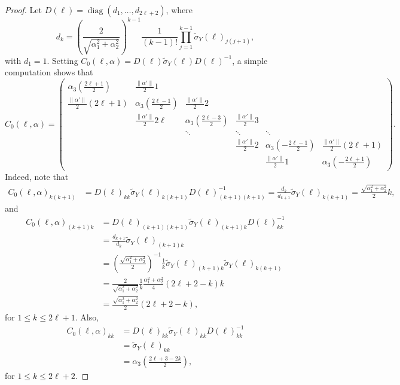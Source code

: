 \documentclass[11pt]{amsart}
\numberwithin{theorem}{section}
\numberwithin{equation}{section}
\theoremstyle{definition}
\numberwithin{example}{section}
\theoremstyle{definition}
\theoremstyle{definition}
\begin{document}
\begin{proof}
Let $D(\ell)= \operatorname{diag}(d_1,\dots,d_{2\ell+2})$, where
\begin{equation*}
    d_k=\left(\frac{2}{\sqrt{\alpha_1^2+\alpha_2^2}}\right)^{k-1}\frac{1}{(k-1)!}\prod_{j=1}^{k-1}\tilde \sigma_{Y}(\ell)_{j(j+1)},
\end{equation*}
with $d_1=1$. Setting $C_0(\ell,\alpha) = D(\ell)\tilde \sigma_{Y}(\ell)D(\ell)^{-1}$, a simple computation shows that 
\begin{equation*}
    C_0(\ell,\alpha)=\begin{pmatrix}
        \alpha_3(\frac{2\ell+1}{2}) & \frac{\|\alpha'\|}{2}1&\\
        \frac{\|\alpha'\|}{2}{(2\ell+1)} &\alpha_3(\frac{2\ell-1}{2})&\frac{\|\alpha'\|}{2}2&\\
        & \frac{\|\alpha'\|}{2}2\ell&\alpha_3(\frac{2\ell-3}{2})&\frac{\|\alpha'\|}{2}3& \\
        &&\ddots&\ddots&\ddots&\\
    &&& \frac{\|\alpha'\|}{2}2&\alpha_3(-\frac{2\ell-1}{2})&\frac{\|\alpha'\|}{2}(2\ell+1)\\
        & &&& \frac{\|\alpha'\|}{2}1&\alpha_3(-\frac{2\ell+1}{2})
    \end{pmatrix}.
\end{equation*}
Indeed, note that 
\begin{align*}
    C_0(\ell,\alpha)_{k(k+1)}&=D(\ell)_{kk}\tilde \sigma_{Y}(\ell)_{k(k+1)}D(\ell)^{-1}_{(k+1)(k+1)}=\frac{d_k}{d_{k+1}}\tilde \sigma_{Y}(\ell)_{k(k+1)}=\frac{\sqrt{\alpha_1^2+\alpha_2^2}}{2}k,
\end{align*}
 and
\begin{align*}
    C_0(\ell,\alpha)_{(k+1)k}&=D(\ell)_{(k+1)(k+1)}\tilde \sigma_{Y}(\ell)_{(k+1)k}D(\ell)^{-1}_{kk}\\
    &=\frac{d_{k+1}}{d_k}\tilde \sigma_{Y}(\ell)_{(k+1)k}\\
    &=\left(\frac{\sqrt{\alpha_1^2+\alpha_2^2}}{2}\right)^{-1}\frac{1}{k}\tilde \sigma_{Y}(\ell)_{(k+1)k}\tilde \sigma_{Y}(\ell)_{k(k+1)}\\
    &=\frac{2}{\sqrt{\alpha_1^2+\alpha_2^2}}\frac{1}{k}\frac{{\alpha_1^2+\alpha_2^2}}{4}(2\ell+2-k)k\\
    &=\frac{\sqrt{\alpha_1^2+\alpha_2^2}}{2}(2\ell+2-k),
\end{align*}
for $1\leq k\leq 2\ell+1$. Also,
\begin{align*}
     C_0(\ell,\alpha)_{kk}&=D(\ell)_{kk}\tilde \sigma_{Y}(\ell)_{kk}D(\ell)^{-1}_{kk}\\
     &=\tilde \sigma_{Y}(\ell)_{kk}\\
     &=\alpha_3 \left(\frac{2\ell+3-2k}{2}\right),
\end{align*}
for $1\leq k\leq 2\ell+2$.



\end{proof}
\end{document}
